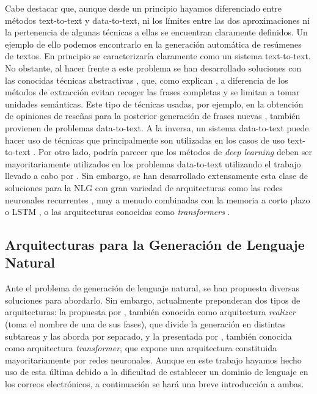 Cabe destacar que, aunque desde un principio hayamos diferenciado entre métodos text-to-text y data-to-text, ni los límites entre las dos aproximaciones ni la pertenencia de algunas técnicas a ellas se encuentran claramente definidos. Un ejemplo de ello podemos encontrarlo en la generación automática de resúmenes de textos. En principio se caracterizaría claramente como un sistema text-to-text. No obstante, al hacer frente a este problema se han desarrollado soluciones con las conocidas técnicas abstractivas \citep{genest2011framework}, que, como explican \cite{hahn2000challenges}, a diferencia de los métodos de extracción evitan recoger las frases completas y se limitan a tomar unidades semánticas. Este tipo de técnicas usadas, por ejemplo, en la obtención de opiniones de reseñas para la posterior generación de frases nuevas \citep{labbe2012towards}, también provienen de problemas data-to-text. A la inversa, un sistema data-to-text puede hacer uso de técnicas que principalmente son utilizadas en los casos de uso text-to-text \citep{mcintyre2009learning, kondadadi2013statistical}. Por otro lado, podría parecer que los métodos de \textit{deep learning} \citep{goodfellow2016deep} deben ser mayoritariamente utilizados en los problemas data-to-text utilizando el trabajo llevado a cabo por \cite{mikolov2013efficient}. Sin embargo, se han desarrollado extensamente esta clase de soluciones para la NLG con gran variedad de arquitecturas como las redes neuronales recurrentes \citep{cho2014learning, tang2016context}, muy a menudo combinadas con la memoria a corto plazo o LSTM \citep{chen2016enhanced}, o las arquitecturas conocidas como \textit{transformers} \citep{transformers}.

\subsection{Arquitecturas para la Generación de Lenguaje Natural}
Ante el problema de generación de lenguaje natural, se han propuesta diversas soluciones para abordarlo. Sin embargo, actualmente preponderan dos tipos de arquitecturas: la propuesta por \cite{biblia}, también conocida como arquitectura \textit{realizer} (toma el nombre de una de sus fases), que divide la generación en distintas subtareas y las aborda por separado, y la presentada por \cite{transformers}, también conocida como arquitectura \textit{transformer}, que expone una arquitectura constituida mayoritariamente por redes neuronales. Aunque en este trabajo hayamos hecho uso de esta última debido a la dificultad de establecer un dominio de lenguaje en los correos electrónicos, a continuación se hará una breve introducción a ambas.

